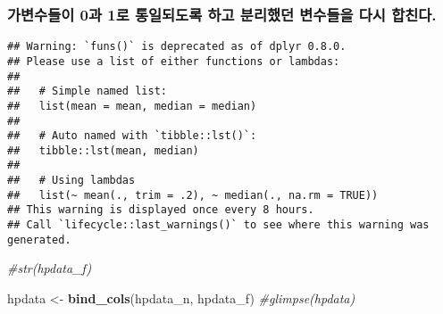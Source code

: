 \documentclass[
]{article}
\newenvironment{Shaded}{\begin{snugshade}}{\end{snugshade}}
\newcommand{\CommentTok}[1]{\textcolor[rgb]{0.56,0.35,0.01}{\textit{#1}}}
\newcommand{\DataTypeTok}[1]{\textcolor[rgb]{0.13,0.29,0.53}{#1}}
\newcommand{\KeywordTok}[1]{\textcolor[rgb]{0.13,0.29,0.53}{\textbf{#1}}}
\newcommand{\NormalTok}[1]{#1}
\newcommand{\OperatorTok}[1]{\textcolor[rgb]{0.81,0.36,0.00}{\textbf{#1}}}
\newcommand{\StringTok}[1]{\textcolor[rgb]{0.31,0.60,0.02}{#1}}
\begin{document}
\hypertarget{uxac00uxbcc0uxc218uxb4e4uxc774-0uxacfc-1uxb85c-uxd1b5uxc77cuxb418uxb3c4uxb85d-uxd558uxace0-uxbd84uxb9acuxd588uxb358-uxbcc0uxc218uxb4e4uxc744-uxb2e4uxc2dc-uxd569uxce5cuxb2e4.}{%
\subsubsection{가변수들이 0과 1로 통일되도록 하고 분리했던 변수들을 다시
합친다.}\label{uxac00uxbcc0uxc218uxb4e4uxc774-0uxacfc-1uxb85c-uxd1b5uxc77cuxb418uxb3c4uxb85d-uxd558uxace0-uxbd84uxb9acuxd588uxb358-uxbcc0uxc218uxb4e4uxc744-uxb2e4uxc2dc-uxd569uxce5cuxb2e4.}}

\begin{Shaded}
\end{Shaded}

\begin{verbatim}
## Warning: `funs()` is deprecated as of dplyr 0.8.0.
## Please use a list of either functions or lambdas: 
## 
##   # Simple named list: 
##   list(mean = mean, median = median)
## 
##   # Auto named with `tibble::lst()`: 
##   tibble::lst(mean, median)
## 
##   # Using lambdas
##   list(~ mean(., trim = .2), ~ median(., na.rm = TRUE))
## This warning is displayed once every 8 hours.
## Call `lifecycle::last_warnings()` to see where this warning was generated.
\end{verbatim}

\begin{Shaded}
\begin{Highlighting}[]
\CommentTok{#str(hpdata_f)}
\end{Highlighting}
\end{Shaded}

\begin{Shaded}
\begin{Highlighting}[]
\NormalTok{hpdata <-}\StringTok{ }\KeywordTok{bind_cols}\NormalTok{(hpdata_n, hpdata_f)}
\CommentTok{#glimpse(hpdata)}
\end{Highlighting}
\end{Shaded}
\end{document}
